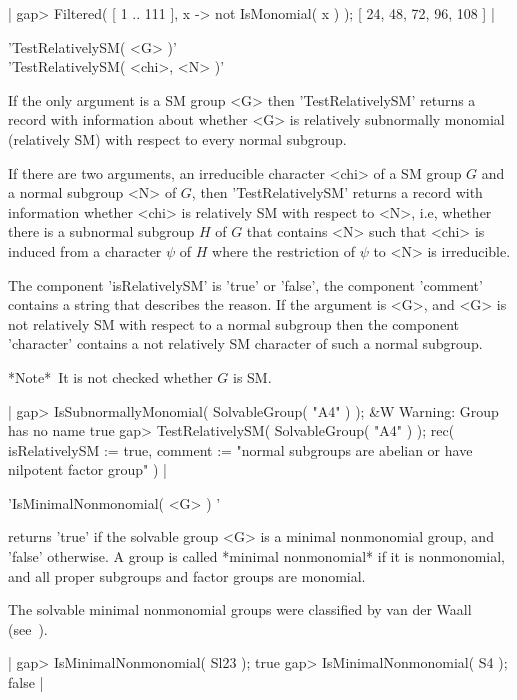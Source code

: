 |    gap> Filtered( [ 1 .. 111 ], x -> not IsMonomial( x ) );
    [ 24, 48, 72, 96, 108 ] |


'TestRelativelySM( <G> )'\\
'TestRelativelySM( <chi>, <N> )'

If the only argument is a SM group <G> then 'TestRelativelySM' returns
a record with information about whether <G> is relatively subnormally
monomial (relatively SM) with respect to every normal subgroup.

If there are two arguments, an irreducible character <chi> of a SM group $G$
and a normal subgroup <N> of $G$, then 'TestRelativelySM' returns a record
with information whether <chi> is relatively SM with respect to <N>, i.e,
whether there is a subnormal subgroup $H$ of $G$ that contains <N> such that
<chi> is induced from a character $\psi$ of $H$ where the restriction of
$\psi$ to <N> is irreducible.

The component 'isRelativelySM' is 'true' or 'false', the component
'comment' contains a string that describes the reason.
If the argument is <G>, and <G> is not relatively SM with respect to
a normal subgroup then the component 'character' contains a not
relatively SM character of such a normal subgroup.

*Note*\:\ It is not checked whether $G$ is SM.

|    gap> IsSubnormallyMonomial( SolvableGroup( "A4" ) );
    &W  Warning: Group has no name
    true
    gap> TestRelativelySM( SolvableGroup( "A4" ) );
    rec(
      isRelativelySM := true,
      comment :=
       "normal subgroups are abelian or have nilpotent factor group" ) |


'IsMinimalNonmonomial( <G> ) '

returns 'true' if the solvable group <G> is a minimal nonmonomial group,
and 'false' otherwise.
A group is called *minimal nonmonomial* if it is nonmonomial,
and all proper subgroups and factor groups are monomial.

The solvable minimal nonmonomial groups were classified by van der Waall
(see~\cite{vdW76}).

|    gap> IsMinimalNonmonomial( Sl23 );
    true
    gap> IsMinimalNonmonomial( S4 );
    false |

